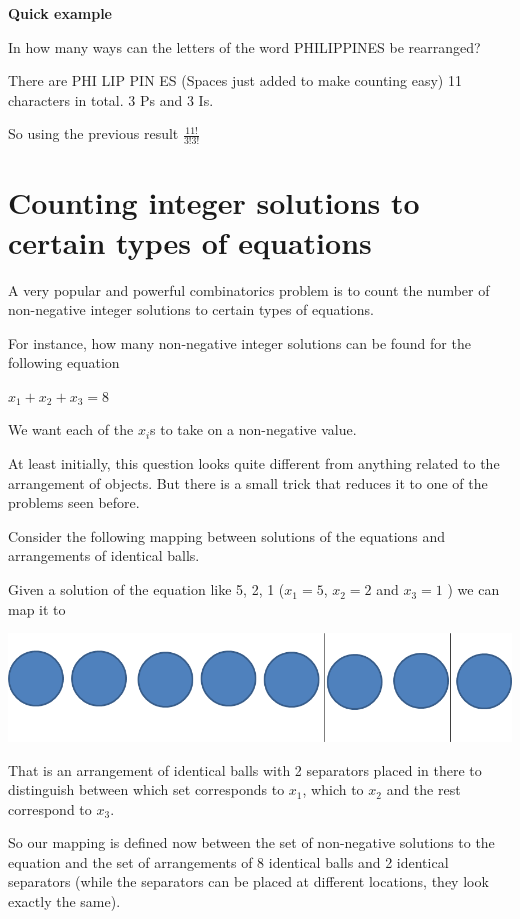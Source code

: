 \documentclass[12pt]{article}
\begin{document}
\textbf{Quick example}

In how many ways can the letters of the word PHILIPPINES be rearranged?

There are PHI LIP PIN ES (Spaces just added to make counting easy) 11 characters in total. 3 Ps and 3 Is. 

So using the previous result $\frac{11!}{3!3!}$

\section*{Counting integer solutions to certain types of equations}

A very popular and powerful combinatorics problem is to count the number of non-negative integer solutions to certain types of equations.

For instance, how many non-negative integer solutions can be found for the following equation

$x_1 + x_2 + x_3 = 8$

We want each of the $x_i$s to take on a non-negative value. 

At least initially, this question looks quite different from anything related to the arrangement of objects. But there is a small trick that reduces it to one of the problems seen before.

Consider the following mapping between solutions of the equations and arrangements of identical balls.

Given a solution of the equation like 5, 2, 1 ($x_1 = 5$, $x_2 = 2$ and $x_3 = 1$ ) we can map it to

\includegraphics[scale=0.5]{./img/Separators.png}

That is an arrangement of identical balls with 2 separators placed in there to distinguish between which set corresponds to $x_1$, which to $x_2$ and the rest correspond to $x_3$.

So our mapping is defined now between the set of non-negative solutions to the equation and the set of arrangements of 8 identical balls and 2 identical separators (while the separators can be placed at different locations, they look exactly the same).
\end{document}
